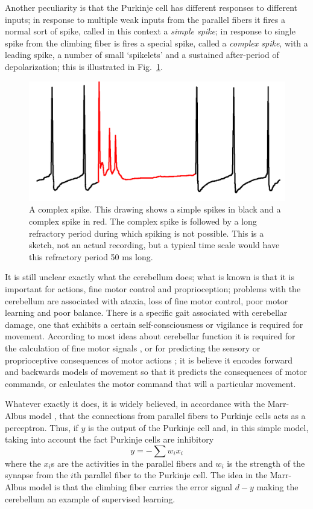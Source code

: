 \documentclass[12pt]{article}
\begin{document}
Another peculiarity is that the Purkinje cell has different responses
to different inputs; in response to multiple weak inputs from the
parallel fibers it fires a normal sort of spike, called in this
context a \textsl{simple spike}; in response to single spike from the
climbing fiber is fires a special spike, called a \textsl{complex
  spike}, with a leading spike, a number of small \lq{}spikelets\rq{}
and a sustained after-period of depolarization; this is illustrated in
Fig.~\ref{fig:spikes}.

\begin{figure}
\begin{center}
\includegraphics[width=8.cm]{complex_spike.png}
\end{center}
\caption{A complex spike. This drawing shows a simple spikes in black
  and a complex spike in red. The complex spike is followed by a long
  refractory period during which spiking is not possible. This is a
  sketch, not an actual recording, but a typical time scale would have
  this refractory period 50 ms long.\label{fig:spikes}}
\end{figure}

It is still unclear exactly what the cerebellum does; what is known is
that it is important for actions, fine motor control and
proprioception; problems with the cerebellum are associated with
ataxia, loss of fine motor control, poor motor learning and poor
balance. There is a specific gait associated with cerebellar damage,
one that exhibits a certain self-consciousness or vigilance is
required for movement. According to most ideas about cerebellar
function it is required for the calculation of fine motor signals
\cite{Albus1971a}, or for predicting the sensory or proprioceptive
consequences of motor actions \cite{GaoEtAl1996a}; it is believe it
encodes forward and backwards models of movement so that it predicts
the consequences of motor commands, or calculates the motor command
that will a particular movement.

Whatever exactly it does, it is widely believed, in accordance with
the Marr-Albus model \cite{Marr1969a,Albus1971a}, that the connections
from parallel fibers to Purkinje cells acts as a perceptron. Thus, if
$y$ is the output of the Purkinje cell and, in this simple model,
taking into account the fact Purkinje cells are inhibitory
\begin{equation}
y=-\sum{w_ix_i}
\end{equation}
where the $x_i$s are the activities in the parallel fibers and $w_i$
is the strength of the synapse from the $i$th parallel fiber to the
Purkinje cell. The idea in the Marr-Albus model is that the climbing
fiber carries the error signal $d-y$ making the cerebellum an example
of supervised learning.
\end{document}
